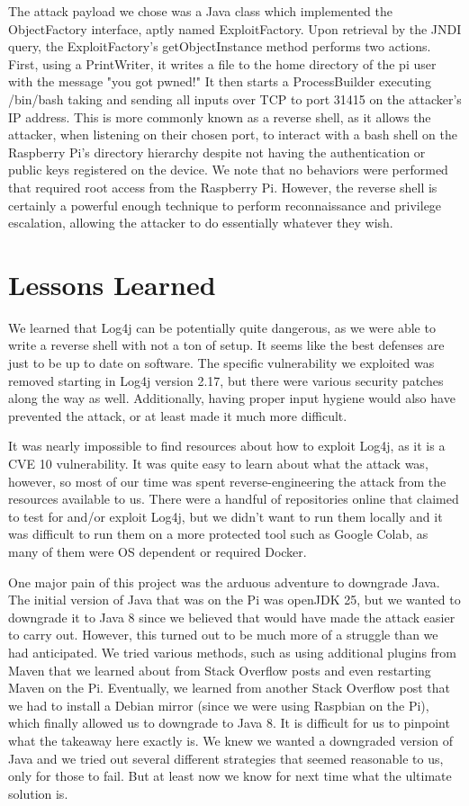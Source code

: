 \documentclass[sigconf]{acmart}
\begin{document}
The attack payload we chose was a Java class which implemented the ObjectFactory interface, aptly named ExploitFactory. Upon retrieval by the JNDI query, the
ExploitFactory's getObjectInstance method performs two actions. First, using a PrintWriter, it writes a file to the home directory of the pi user
with the message "you got pwned!" It then starts a ProcessBuilder executing /bin/bash taking and sending all inputs over TCP to port 31415 on
the attacker's IP address. This is more commonly known as a reverse shell, as it allows the attacker, when listening on their chosen port,
to interact with a bash shell on the Raspberry Pi's directory hierarchy despite not having the authentication or public keys registered on the device. 
We note that no behaviors were performed that required root access from the Raspberry Pi. However, the reverse shell is certainly
a powerful enough technique to perform reconnaissance and privilege escalation, allowing the attacker to do essentially whatever they wish. 


\section{Lessons Learned}

We learned that Log4j can be potentially quite dangerous, as we were able to write a reverse shell with not a ton of setup. It seems
like the best defenses are just to be up to date on software. The specific vulnerability we exploited was removed starting in Log4j version
2.17, but there were various security patches along the way as well. Additionally, having proper input hygiene would also have prevented
the attack, or at least made it much more difficult. 

It was nearly impossible to find resources about how to exploit Log4j, as it is a CVE 10 vulnerability. It was quite easy to
learn about what the attack was, however, so most of our time was spent reverse-engineering the attack from the resources available to us.
There were a handful of repositories online that claimed to test for and/or exploit Log4j, but we didn't want to run them locally and
it was difficult to run them on a more protected tool such as Google Colab, as many of them were OS dependent or required Docker.

One major pain of this project was the arduous adventure to downgrade Java. The initial version of Java that was on
the Pi was openJDK 25, but we wanted to downgrade it to Java 8 since we believed that would have made the attack
easier to carry out. However, this turned out to be much more of a struggle than we had anticipated. We tried various
methods, such as using additional plugins from Maven that we learned about from Stack Overflow posts and even
restarting Maven on the Pi. Eventually, we learned from another Stack Overflow post that we had to install a Debian
mirror (since we were using Raspbian on the Pi), which finally allowed us to downgrade to Java 8. It is difficult for us
to pinpoint what the takeaway here exactly is. We knew we wanted a downgraded version of Java and we tried out
several different strategies that seemed reasonable to us, only for those to fail. But at least now we know for next
time what the ultimate solution is.
\end{document}
